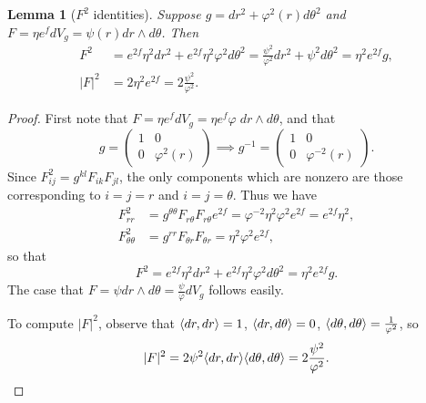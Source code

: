 \documentclass[12pt, a4paper, reqno, oneside]{amsart}
\renewcommand{\phi}{\varphi}
\DeclarePairedDelimiter\ip{\langle}{\rangle} %
\newcommand{\dvol}{dV_{g}}
\numberwithin{equation}{section}
\theoremstyle{plain}
\newtheorem{lemma}[theorem]{Lemma}
\theoremstyle{definition}
\theoremstyle{plain}
\begin{document}
\begin{lemma}[$F^2$ identities]\label{Fsq_comp}
  Suppose $g=dr^{2}+\phi^{2}(r)d\theta^{2}$ and $F=\eta e^{f}\dvol=\psi(r) dr\wedge d\theta$. Then
  \begin{align*}
    F^{2} &= e^{2f}\eta^{2}dr^{2}+e^{2f}\eta^{2}\phi^{2}d\theta^{2} = \frac{\psi^{2}}{\phi^{2}}dr^{2}+\psi^{2}d\theta^{2} = \eta^{2}e^{2f}g,\\
    |F|^{2} &= 2\eta^{2} e^{2f} = 2\frac{\psi^{2}}{\phi^{2}}.
  \end{align*}
\end{lemma}
\begin{proof}
  First note that $F=\eta e^{f}\dvol=\eta e^{f}\varphi \;dr\wedge d\theta$, and that 
  \[
    g = \begin{pmatrix}
      1 & 0\\
      0 & \phi^{2}(r)
    \end{pmatrix} \implies g^{-1} = \begin{pmatrix}
      1 & 0\\
      0 & \phi^{-2}(r)
    \end{pmatrix}.
  \]
  Since $F_{ij}^{2} = g^{kl}F_{ik}F_{jl}$, the only components which are nonzero are those corresponding to $i=j=r$ and $i=j=\theta$. Thus we have
  \begin{align*}
    F_{rr}^{2} &= g^{\theta\theta}F_{r\theta}F_{r\theta} e^{2f}= \phi^{-2}\eta^{2}\phi^{2}e^{2f}= e^{2f}\eta^{2},\\
    F_{\theta\theta}^{2} &= g^{rr}F_{\theta r}F_{\theta r} = \eta^{2}\phi^{2}e^{2f},
  \end{align*}
  so that
  \[
    F^{2} = e^{2f}\eta^{2}dr^{2}+e^{2f}\eta^{2}\phi^{2}d\theta^{2} = \eta^2 e^{2f}g.
  \]
  The case that $F=\psi dr\wedge d\theta = \frac{\psi}{\phi}\dvol$ follows easily.

  To compute $|F|^{2}$, observe that $\ip{dr,dr}=1$, $\ip{dr,d\theta}=0$, $\ip{d\theta,d\theta}=\frac{1}{\phi^{2}}$, so 
  \[
    |F|^{2}= 2\psi^{2}\ip{dr,dr}\ip{d\theta,d\theta}= 2\frac{\psi^{2}}{\phi^{2}}.
  \]
\end{proof}
\end{document}

